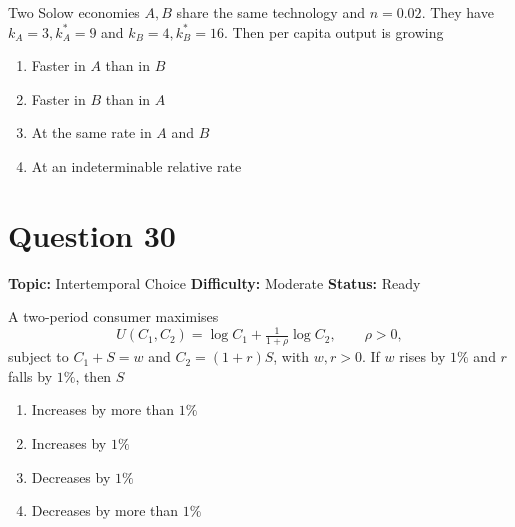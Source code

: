 \documentclass[11pt]{article}
\begin{document}
Two Solow economies $A, B$ share the same technology and $n = 0.02$. They have
$k_A = 3, k^*_A = 9$ and $k_B = 4, k^*_B = 16$. Then per capita output is growing
\begin{enumerate}[label=(\Alph*)]
\item Faster in $A$ than in $B$
\item Faster in $B$ than in $A$
\item At the same rate in $A$ and $B$
\item At an indeterminable relative rate
\end{enumerate}

\newpage

\section*{Question 30}


\noindent\textbf{Topic:} Intertemporal Choice \quad \textbf{Difficulty:} Moderate \quad \textbf{Status:} Ready



A two-period consumer maximises
\[
U(C_1, C_2) = \log C_1 + \tfrac{1}{1+\rho}\log C_2, \qquad \rho > 0,
\]
subject to $C_1 + S = w$ and $C_2 = (1+r) S$, with $w, r > 0$. If $w$ rises by
$1\%$ and $r$ falls by $1\%$, then $S$
\begin{enumerate}[label=(\Alph*)]
\item Increases by more than $1\%$
\item Increases by $1\%$
\item Decreases by $1\%$
\item Decreases by more than $1\%$
\end{enumerate}
\end{document}
